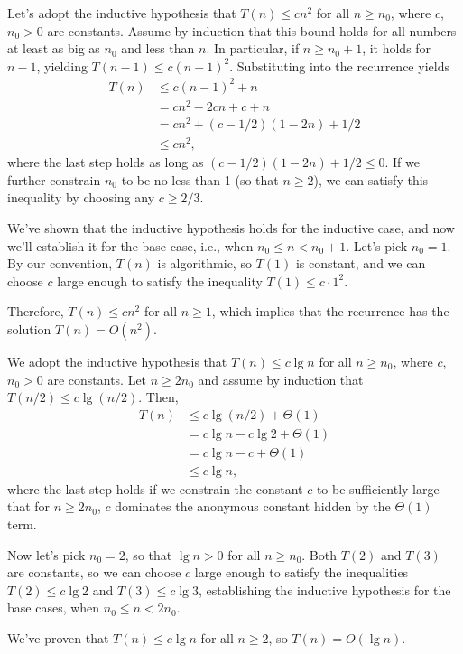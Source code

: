 \subexercise
Let's adopt the inductive hypothesis that $T(n)\le cn^2$ for all $n\ge n_0$, where $c$, $n_0>0$ are constants.
Assume by induction that this bound holds for all numbers at least as big as $n_0$ and less than $n$.
In particular, if $n\ge n_0+1$, it holds for $n-1$, yielding $T(n-1)\le c(n-1)^2$.
Substituting into the recurrence yields
\begin{align*}
    T(n) &\le c(n-1)^2+n \\
    &= cn^2-2cn+c+n \\
    &= cn^2+(c-1/2)(1-2n)+1/2 \\
    &\le cn^2,
\end{align*}
where the last step holds as long as $(c-1/2)(1-2n)+1/2\le0$.
If we further constrain $n_0$ to be no less than 1 (so that $n\ge2$), we can satisfy this inequality by choosing any $c\ge2/3$.

We've shown that the inductive hypothesis holds for the inductive case, and now we'll establish it for the base case, i.e., when $n_0\le n<n_0+1$.
Let's pick $n_0=1$.
By our convention, $T(n)$ is algorithmic, so $T(1)$ is constant, and we can choose $c$ large enough to satisfy the inequality $T(1)\le c\cdot1^2$.

Therefore, $T(n)\le cn^2$ for all $n\ge1$, which implies that the recurrence has the solution $T(n)=O(n^2)$.

\subexercise
We adopt the inductive hypothesis that $T(n)\le c\lg n$ for all $n\ge n_0$, where $c$, $n_0>0$ are constants.
Let $n\ge2n_0$ and assume by induction that $T(n/2)\le c\lg(n/2)$.
Then,
\begin{align*}
    T(n) &\le c\lg(n/2)+\Theta(1) \\
    &= c\lg n-c\lg2+\Theta(1) \\
    &= c\lg n-c+\Theta(1) \\
    &\le c\lg n,
\end{align*}
where the last step holds if we constrain the constant $c$ to be sufficiently large that for $n\ge2n_0$, $c$ dominates the anonymous constant hidden by the $\Theta(1)$ term.

Now let's pick $n_0=2$, so that $\lg n>0$ for all $n\ge n_0$.
Both $T(2)$ and $T(3)$ are constants, so we can choose $c$ large enough to satisfy the inequalities $T(2)\le c\lg2$ and $T(3)\le c\lg3$, establishing the inductive hypothesis for the base cases, when $n_0\le n<2n_0$.

We've proven that $T(n)\le c\lg n$ for all $n\ge2$, so $T(n)=O(\lg n)$.

